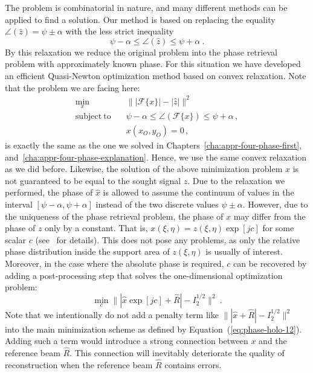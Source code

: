 The problem is combinatorial in nature, and many different methods
can be applied to find a solution. Our method is based on
replacing the equality $\angle(\hat{z})=\psi\pm\alpha$ with the
less strict inequality
\begin{equation}
  \label{eq:phase-holo-11}
  \psi - \alpha \leq \angle(\hat{z}) \leq \psi + \alpha\ .
\end{equation}
By this relaxation we reduce the original problem into the phase
retrieval problem with approximately known phase.  For this
situation we have developed an efficient Quasi-Newton optimization
method based on convex relaxation. Note that the problem we are facing
here:
\begin{equation}
  \label{eq:phase-holo-12}
  \begin{split}
    \min_{x} &\quad \||\mathcal{F}\{x\}| -  |\hat{z}|\|^{2}\\
    \mathrm{subject\ to} &\quad \psi - \alpha \leq \angle(\mathcal{F}\{x\}) \leq
    \psi+\alpha \, , \\
    &\quad x(x_{O}, y_{O}) = 0 \, ,
  \end{split}
\end{equation}
is exactly the same as the one we solved in
Chapters~\ref{cha:appr-four-phase-first},
and~\ref{cha:appr-four-phase-explanation}. Hence, we use the same
convex relaxation as we did before. Likewise, the solution of the
above minimization problem $x$ is not guaranteed to be equal to the
sought signal $z$. Due to the relaxation we performed, the phase of $\hat{x}$ is
allowed to assume the continuum of values in the interval
$[\psi-\alpha, \psi+\alpha]$ instead of the two discrete values
$\psi\pm\alpha$.  However, due to the uniqueness of the phase
retrieval problem, the phase of $x$ may differ from the phase of $z$
only by a constant.  That is, $x(\xi,\eta)=z(\xi,\eta)\exp[jc]$ for
some scalar $c$ (see~ for details). This
does not pose any problems, as only the relative phase distribution inside
the support area of $z(\xi,\eta)$ is usually of interest. Moreover, in
the case where the absolute phase is required, $c$ can be recovered by
adding a post-processing step that solves the one-dimensional
optimization problem:
\begin{equation}
  \label{eq:phase-holo-13}
  \displaystyle\min_{c} \||\hat{x}\exp[jc] + \hat{R}| -
  I_{2}^{1/2}\|^{2}\ .
\end{equation}
Note that we intentionally do not add a penalty term like
$\||\hat{x} + \hat{R}| - I_{2}^{1/2}\|^{2}$ into the main
minimization scheme as defined by Equation~(\ref{eq:phase-holo-12}).  Adding
such a term would introduce a strong connection between $x$ and
the reference beam $\hat{R}$. This connection will inevitably
deteriorate the quality of reconstruction when the reference beam
$\hat{R}$ contains errors.


